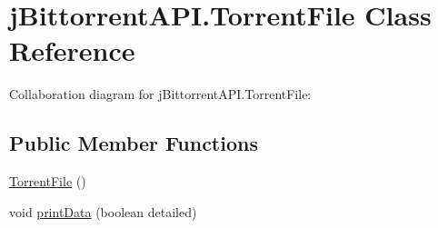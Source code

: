 \hypertarget{classj_bittorrent_a_p_i_1_1_torrent_file}{
\section{jBittorrentAPI.TorrentFile Class Reference}
\label{classj_bittorrent_a_p_i_1_1_torrent_file}
}
Collaboration diagram for jBittorrentAPI.TorrentFile:\subsection*{Public Member Functions}
\begin{DoxyCompactItemize}
\item 
\hyperlink{classj_bittorrent_a_p_i_1_1_torrent_file_aac2b828978bc931932146200e5ec55b9}{TorrentFile} ()
\item 
void \hyperlink{classj_bittorrent_a_p_i_1_1_torrent_file_a3d7505b0e8df0b65154df45e277b400c}{printData} (boolean detailed)
\end{DoxyCompactItemize}
